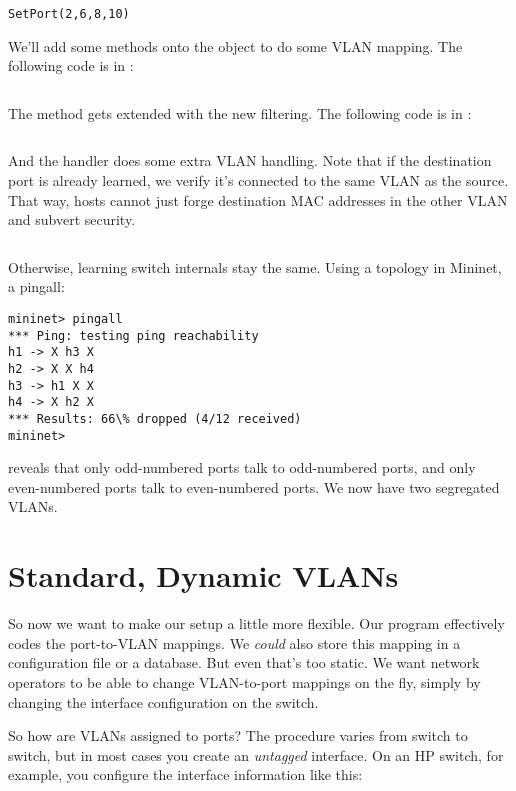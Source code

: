 \begin{verbatim}
SetPort(2,6,8,10)
\end{verbatim}

We'll add some methods onto the  object to do some VLAN mapping.  The following
code is in :

\inputminted[firstline=60]{python}{code/handling_vlans/network_information_base_static.py}

The  method gets extended with the new filtering.  
The following
code is in :

\inputminted[firstline=23,lastline=30]{python}{code/handling_vlans/vlan1.py}

And the  handler does some extra VLAN handling.  Note that if the destination port is already
learned, we verify it's connected to the same VLAN as the source.  That way, hosts cannot just forge 
destination MAC addresses in the other VLAN and subvert security.  

\inputminted[firstline=43,lastline=73]{python}{code/handling_vlans/vlan1.py}

Otherwise, learning switch internals stay the same.  Using a  topology in Mininet,
a pingall:

\begin{verbatim}
mininet> pingall
*** Ping: testing ping reachability
h1 -> X h3 X
h2 -> X X h4
h3 -> h1 X X
h4 -> X h2 X
*** Results: 66\% dropped (4/12 received)
mininet>
\end{verbatim}

reveals that only odd-numbered ports talk to odd-numbered ports, and only even-numbered ports talk to
even-numbered ports.  We now have two segregated VLANs.

\section{Standard, Dynamic VLANs}

So now we want to make our setup a little more flexible.  Our program effectively codes the port-to-VLAN
mappings.  We \emph{could} also store this mapping in a configuration file or a database.  But even that's
too static.  We want network operators to be able to change VLAN-to-port mappings on the fly, simply
by changing the interface configuration on the switch.

So how are VLANs assigned to ports?  The procedure varies from switch to switch, but in most cases you
create an \emph{untagged} interface.  On an HP switch, for example, you configure the interface information
like this:

